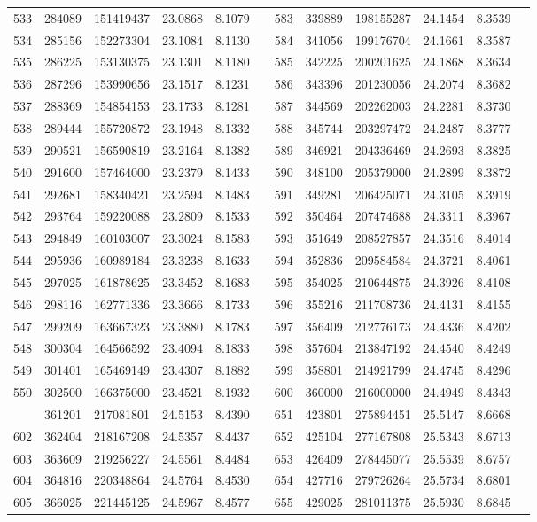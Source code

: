 \begin{longtable}{SSSSSSSSSSSS}
533&284089&151419437&23.0868&8.1079&&583&339889&198155287&24.1454&8.3539\\
534&285156&152273304&23.1084&8.1130&&584&341056&199176704&24.1661&8.3587\\
535&286225&153130375&23.1301&8.1180&&585&342225&200201625&24.1868&8.3634\\
536&287296&153990656&23.1517&8.1231&&586&343396&201230056&24.2074&8.3682\\
537&288369&154854153&23.1733&8.1281&&587&344569&202262003&24.2281&8.3730\\
538&289444&155720872&23.1948&8.1332&&588&345744&203297472&24.2487&8.3777\\
539&290521&156590819&23.2164&8.1382&&589&346921&204336469&24.2693&8.3825\\
540&291600&157464000&23.2379&8.1433&&590&348100&205379000&24.2899&8.3872\\
541&292681&158340421&23.2594&8.1483&&591&349281&206425071&24.3105&8.3919\\
542&293764&159220088&23.2809&8.1533&&592&350464&207474688&24.3311&8.3967\\
543&294849&160103007&23.3024&8.1583&&593&351649&208527857&24.3516&8.4014\\
544&295936&160989184&23.3238&8.1633&&594&352836&209584584&24.3721&8.4061\\
545&297025&161878625&23.3452&8.1683&&595&354025&210644875&24.3926&8.4108\\
546&298116&162771336&23.3666&8.1733&&596&355216&211708736&24.4131&8.4155\\
547&299209&163667323&23.3880&8.1783&&597&356409&212776173&24.4336&8.4202\\
548&300304&164566592&23.4094&8.1833&&598&357604&213847192&24.4540&8.4249\\
549&301401&165469149&23.4307&8.1882&&599&358801&214921799&24.4745&8.4296\\
550&302500&166375000&23.4521&8.1932&&600&360000&216000000&24.4949&8.4343\\
&361201&217081801&24.5153&8.4390&&651&423801&275894451&25.5147&8.6668\\
602&362404&218167208&24.5357&8.4437&&652&425104&277167808&25.5343&8.6713\\
603&363609&219256227&24.5561&8.4484&&653&426409&278445077&25.5539&8.6757\\
604&364816&220348864&24.5764&8.4530&&654&427716&279726264&25.5734&8.6801\\
605&366025&221445125&24.5967&8.4577&&655&429025&281011375&25.5930&8.6845\\

\end{longtable}

